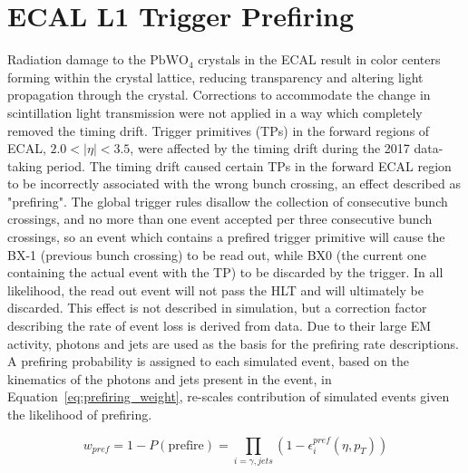 \section{ECAL L1 Trigger Prefiring}\label{ch:prefire}
Radiation damage to the $\mathrm{PbWO_4}$ crystals in the ECAL result in color centers forming within the crystal lattice, reducing transparency and altering light propagation through the crystal. Corrections to accommodate the change in scintillation light transmission were not applied in a way which completely removed the timing drift. Trigger primitives (TPs) in the forward regions of ECAL, $2.0 < |\eta| < 3.5$, were affected by the timing drift during the 2017 data-taking period. The timing drift caused certain TPs in the forward ECAL region to be incorrectly associated with the wrong bunch crossing, an effect described as "prefiring". The global trigger rules disallow the collection of consecutive bunch crossings, and no more than one event accepted per three consecutive bunch crossings, so an event which contains a prefired trigger primitive will cause the BX-1 (previous bunch crossing) to be read out, while BX0 (the current one containing the actual event with the TP) to be discarded by the trigger. In all likelihood, the read out event will not pass the HLT and will ultimately be discarded.
This effect is not described in simulation, but a correction factor describing the rate of event loss is derived from data. Due to their large EM activity, photons and jets are used as the basis for the prefiring rate descriptions. A prefiring probability is assigned to each simulated event, based on the kinematics of the photons and jets present in the event, in Equation~\ref{eq:prefiring_weight}, re-scales contribution of simulated events given the likelihood of prefiring.

\begin{equation}
    w_{pref} = 1 - P(\mathrm{prefire}) = \prod_{i=\gamma,jets}{(1 - \epsilon_i^{pref}(\eta,p_T))}
    \label{eq:prefiring_weight}
\end{equation}
